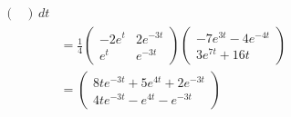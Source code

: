 \documentclass[11pt, titlepage]{article}
\begin{document}
\begin{solution}
\begin{align*}
\begin{pmatrix}
                \end{pmatrix} \, dt \\
                &= \frac{1}{4}
                \begin{pmatrix}
                    -2e^{t} & 2e^{-3t} \\
                    e^{t} & e^{-3t}
                \end{pmatrix}
                \begin{pmatrix}
                    -7e^{3t} - 4e^{-4t} \\
                    3e^{7t} + 16t
                \end{pmatrix} \\
                &= 
                \begin{pmatrix}
                    8te^{-3t} + 5e^{4t} + 2e^{-3t} \\
                    4te^{-3t} - e^{4t} - e^{-3t}
                \end{pmatrix}
        \end{align*}
    \end{solution}
\end{document}
